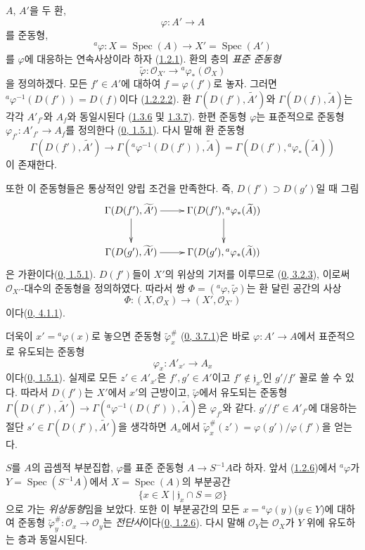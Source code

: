 \begin{env}[1.6.1]
\label{I.1.6.1-ko}
$A$, $A'$을 두 환,
\[
  \varphi:A'\to A
\]
를 준동형,
\[
  {}^a\varphi:X=\operatorname{Spec}(A)\to
  X'=\operatorname{Spec}(A')
\]
를 $\varphi$에 대응하는 연속사상이라 하자
(\hyperref[I.1.2.1-ko]{1.2.1}). 환의 층의 \emph{표준 준동형}
\[
  \widetilde{\varphi}:\mathscr{O}_{X'}\to
  {}^a\varphi_*(\mathscr{O}_X)
\]
을 정의하겠다. 모든 $f'\in A'$에 대하여 $f=\varphi(f')$로 놓자.
그러면
${}^a\varphi^{-1}(D(f'))=D(f)$이다
(\hyperref[I.1.2.2.2-ko]{1.2.2.2}). 환
$\Gamma(D(f'),\widetilde{A'})$와
$\Gamma(D(f),\widetilde{A})$는 각각 $A'_{f'}$와 $A_f$와 동일시된다
(\hyperref[I.1.3.6-ko]{1.3.6} 및
\hyperref[I.1.3.7-ko]{1.3.7}). 한편 준동형 $\varphi$는 표준적으로
준동형 $\varphi_{f'}:A'_{f'}\to A_f$를 정의한다
(\hyperref[0.1.5.1-ko]{0, 1.5.1}). 다시 말해 환 준동형
\[
  \Gamma(D(f'),\widetilde{A'})\to
  \Gamma({}^a\varphi^{-1}(D(f')),\widetilde{A})
  =\Gamma(D(f'),{}^a\varphi_*(\widetilde{A}))
\]
이 존재한다.

또한 이 준동형들은 통상적인 양립 조건을 만족한다. 즉,
$D(f')\supset D(g')$일 때 그림
\[
  \xymatrix{
    \Gamma(D(f'),\widetilde{A'})\ar[r]\ar[d] &
    \Gamma(D(f'),{}^a\varphi_*(\widetilde{A}))\ar[d]\\
    \Gamma(D(g'),\widetilde{A'})\ar[r] &
    \Gamma(D(g'),{}^a\varphi_*(\widetilde{A}))
  }
\]
은 가환이다(\hyperref[0.1.5.1-ko]{0, 1.5.1}). $D(f')$들이
$X'$의 위상의 기저를 이루므로
(\hyperref[0.3.2.3-ko]{0, 3.2.3}), 이로써
$\mathscr{O}_{X'}$-대수의 준동형을 정의하였다. 따라서 쌍
$\Phi=({}^a\varphi,\widetilde{\varphi})$는 환 달린 공간의 사상
\[
  \Phi:(X,\mathscr{O}_X)\to(X',\mathscr{O}_{X'})
\]
이다(\hyperref[0.4.1.1-ko]{0, 4.1.1}).

더욱이 $x'={}^a\varphi(x)$로 놓으면 준동형
$\widetilde{\varphi}_x^\#$
(\hyperref[0.3.7.1-ko]{0, 3.7.1})은 바로 $\varphi:A'\to A$에서
표준적으로 유도되는 준동형
\[
  \varphi_x:A'_{x'}\to A_x
\]
이다(\hyperref[0.1.5.1-ko]{0, 1.5.1}). 실제로 모든
$z'\in A'_{x'}$은 $f',g'\in A'$이고
$f'\notin\mathfrak{j}_{x'}$인 $g'/f'$ 꼴로 쓸 수 있다. 따라서
$D(f')$는 $X'$에서 $x'$의 근방이고, $\widetilde{\varphi}$에서
유도되는 준동형
$\Gamma(D(f'),\widetilde{A'})\to
\Gamma({}^a\varphi^{-1}(D(f')),\widetilde{A})$은
$\varphi_{f'}$와 같다. $g'/f'\in A'_{f'}$에 대응하는 절단
$s'\in\Gamma(D(f'),\widetilde{A'})$을 생각하면 $A_x$에서
$\widetilde{\varphi}_x^\#(z')=\varphi(g')/\varphi(f')$을 얻는다.
\end{env}

\begin{example}[1.6.2]
\label{I.1.6.2-ko}
$S$를 $A$의 곱셈적 부분집합, $\varphi$를 표준 준동형
$A\to S^{-1}A$라 하자. 앞서
(\hyperref[I.1.2.6-ko]{1.2.6})에서 ${}^a\varphi$가
$Y=\operatorname{Spec}(S^{-1}A)$에서
$X=\operatorname{Spec}(A)$의 부분공간
\[
  \{x\in X\mid\mathfrak{j}_x\cap S=\varnothing\}
\]
으로 가는 \emph{위상동형}임을 보았다. 또한 이 부분공간의 모든
$x={}^a\varphi(y)$($y\in Y$)에 대하여 준동형
$\widetilde{\varphi}_y^\#:\mathscr{O}_x\to\mathscr{O}_y$는
\emph{전단사}이다(\hyperref[0.1.2.6-ko]{0, 1.2.6}). 다시 말해
$\mathscr{O}_Y$는 $\mathscr{O}_X$가 $Y$ 위에 유도하는 층과
동일시된다.
\end{example}

